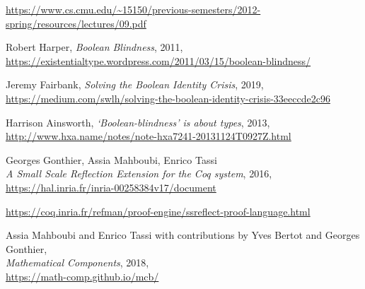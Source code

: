 \documentclass[declaration,mgr,english,shortabstract]{iithesis}
\begin{document}
\begin{thebibliography}{1}
    \url{https://www.cs.cmu.edu/~15150/previous-semesters/2012-spring/resources/lectures/09.pdf}

    Robert Harper,
    \textit{Boolean Blindness},
    2011, \\
    \url{https://existentialtype.wordpress.com/2011/03/15/boolean-blindness/}

    Jeremy Fairbank,
    \textit{Solving the Boolean Identity Crisis},
    2019, \\
    \url{https://medium.com/swlh/solving-the-boolean-identity-crisis-33eeccde2c96}

    Harrison Ainsworth,
    \textit{‘Boolean-blindness’ is about types},
    2013, \\
    \url{http://www.hxa.name/notes/note-hxa7241-20131124T0927Z.html}

    Georges Gonthier, Assia Mahboubi, Enrico Tassi \\
    \textit{A Small Scale Reflection Extension for the Coq system}, 2016, \\
    \url{https://hal.inria.fr/inria-00258384v17/document}

    \url{https://coq.inria.fr/refman/proof-engine/ssreflect-proof-language.html}
    
    Assia Mahboubi and Enrico Tassi with contributions by Yves Bertot and Georges Gonthier, \\
    \textit{Mathematical Components}, 2018, \\
    \url{https://math-comp.github.io/mcb/}


\end{thebibliography}
\end{document}
